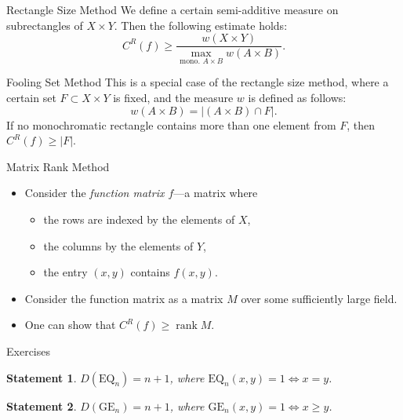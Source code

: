 \documentclass[
aspectratio=169]{beamer}
\newcommand{\pitem}{\pause\item}
\newtheorem{statement}{Statement}
\DeclareMathOperator{\rank}{rank}
\begin{document}
\begin{frame}{Rectangle Size Method}
    We define a certain semi-additive measure on subrectangles of $X \times Y$. Then the following estimate holds:
    \[
    C^R(f) \ge \frac{w(X \times Y)}{\max\limits_{\text{mono. } A \times B} w(A \times B)}.
    \]

    \pause
    \begin{block}{Fooling Set Method}
        This is a special case of the rectangle size method, where a certain set $F \subset X \times Y$ is fixed, and the measure $w$ is defined as follows:
        \[
        w(A \times B) = |(A \times B) \cap F|.
        \]
        If no monochromatic rectangle contains more than one element from $F$, then $C^R(f) \ge |F|$.
    \end{block}
\end{frame}

\begin{frame}{Matrix Rank Method}
    \begin{itemize}
        \item Consider the \emph{function matrix $f$}---a matrix where
        \begin{itemize}
            \item the rows are indexed by the elements of $X$,
            \item the columns by the elements of $Y$,
            \item the entry $(x,y)$ contains $f(x,y)$.
        \end{itemize}
        \pitem Consider the function matrix as a matrix $M$ over some sufficiently large field.
        \pitem One can show that $C^R(f) \ge \rank M$.
    \end{itemize}
\end{frame}

\begin{frame}{Exercises}

\begin{statement}
    $D(\mathrm{EQ}_n) = n + 1$, where $\mathrm{EQ}_n(x,y) = 1 \iff x = y$.
\end{statement}

\pause
\begin{statement}
    $D(\mathrm{GE}_n) = n + 1$, where $\mathrm{GE}_n(x,y) = 1 \iff x \ge y$.
\end{statement}

\end{frame}
\end{document}
